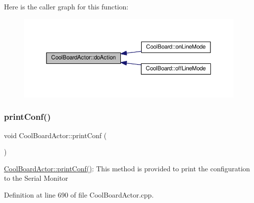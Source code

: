 Here is the caller graph for this function\+:
\nopagebreak
\begin{figure}[H]
\begin{center}
\leavevmode
\includegraphics[width=350pt]{dc/d69/class_cool_board_actor_a96a45658d32c6b95caa2f385c7da32cd_icgraph}
\end{center}
\end{figure}
\mbox{\label{class_cool_board_actor_aabb10e7aebc3249ffc940530de29f84a}} 
\subsubsection{\texorpdfstring{print\+Conf()}{printConf()}}
{\footnotesize\ttfamily void Cool\+Board\+Actor\+::print\+Conf (\begin{DoxyParamCaption}{ }\end{DoxyParamCaption})}

\hyperlink{class_cool_board_actor_aabb10e7aebc3249ffc940530de29f84a}{Cool\+Board\+Actor\+::print\+Conf()}\+: This method is provided to print the configuration to the Serial Monitor 

Definition at line 690 of file Cool\+Board\+Actor.\+cpp.


